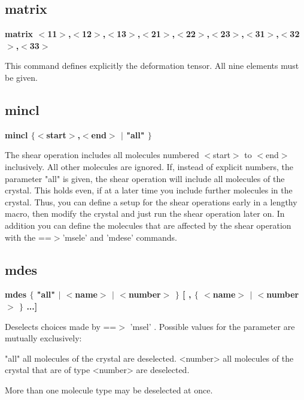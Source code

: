 \subsection*{matrix}
{\bf matrix $ <$11$> $,$ <$12$> $,$ <$13$> $,$ <$21$> $,$ <$22$> $,$ <$23$> $,$ <$31$> $,$ <$32$> $,$ <$33$> $ \par }
\par
\vspace{3pt}
This command defines explicitly the deformation tensor. All 
nine elements must be given. 
\subsection*{mincl}
{\bf mincl $ \{$$ <$start$> $,$ <$end$> $ $| $ "all" $\} $ \par }
\par
\vspace{3pt}
The shear operation includes all molecules numbered $ <$start$> $ to $ <$end$> $ 
inclusively. All other molecules are ignored. 
If, instead of explicit numbers, the parameter "all" is given, the 
shear operation will include all molecules of the crystal. This holds 
even, if at a later time you include further molecules in the crystal. 
Thus, you can define a setup for the shear operations early in a 
lengthy macro, then modify the crystal and just run the shear 
operation later on. 
In addition you can define the molecules that are affected by the 
shear operation with the ==$> $'msele' and 'mdese' commands. 
\subsection*{mdes}
{\bf mdes $ \{$ "all" $| $ $ <$name$> $ $| $ $ <$number$> $ $\} $ [ , $ \{$ $ <$name$> $ $| $ $ <$number$> $ $\} $ ...] \par }
\par
\vspace{3pt}
Deselects choices made by ==$> $ 'msel' . Possible values 
for the parameter are mutually exclusively: 
\par
\begin{MacVerbatim}
"all"     all molecules of the crystal are deselected.
<number>  all molecules of the crystal that are of type <number>
          are deselected.
\end{MacVerbatim}
More than one molecule type may be deselected at once. 
